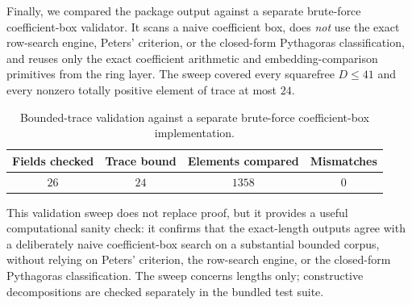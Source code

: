 \documentclass[manuscript,screen]{acmart}
\renewcommand{\le}{\leqslant}
\theoremstyle{plain}
\theoremstyle{definition}
\theoremstyle{nonitalicremark}
\begin{document}
Finally, we compared the package output against a separate brute-force coefficient-box validator.
It scans a naive coefficient box, does \emph{not} use the exact row-search engine, Peters'
criterion, or the closed-form Pythagoras classification, and reuses only the exact coefficient
arithmetic and embedding-comparison primitives from the ring layer.
The sweep covered every squarefree $D\le 41$ and every nonzero totally positive element of trace at most $24$.

\begin{table}[tbp]
\centering
\renewcommand{\arraystretch}{1.12}
\begin{tabular}{cccc}
\toprule
Fields checked & Trace bound & Elements compared & Mismatches \\
\midrule
$26$ & $24$ & $1358$ & $0$ \\
\bottomrule
\end{tabular}
\caption{Bounded-trace validation against a separate brute-force coefficient-box implementation.}
\label{tab:validation}
\end{table}

This validation sweep does not replace proof, but it provides a useful computational sanity check:
it confirms that the exact-length outputs agree with a deliberately naive coefficient-box search on
a substantial bounded corpus, without relying on Peters' criterion, the row-search engine, or the
closed-form Pythagoras classification. The sweep concerns lengths only; constructive decompositions
are checked separately in the bundled test suite.
\end{document}
